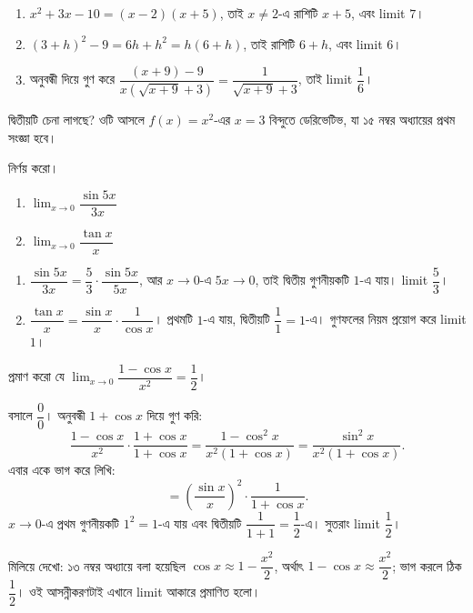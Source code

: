 \documentclass[11pt]{article}
\begin{document}
\begin{sol}
\begin{enumerate}
  \item $x^{2}+3x-10 = (x-2)(x+5)$, তাই $x \neq 2$-এ রাশিটি $x+5$, এবং
        limit $7$।
  \item $(3+h)^{2}-9 = 6h + h^{2} = h(6+h)$, তাই রাশিটি $6+h$, এবং limit $6$।
  \item অনুবন্ধী দিয়ে গুণ করে
        $\dfrac{(x+9)-9}{x\left( \sqrt{x+9}+3 \right)}
        = \dfrac{1}{\sqrt{x+9}+3}$, তাই limit $\dfrac{1}{6}$।
\end{enumerate}
দ্বিতীয়টি চেনা লাগছে? ওটি আসলে $f(x) = x^{2}$-এর $x = 3$ বিন্দুতে ডেরিভেটিভ,
যা ১৫ নম্বর অধ্যায়ের প্রথম সংজ্ঞা হবে।
\end{sol}

 নির্ণয় করো।
\begin{enumerate}
  \item $\lim_{x \to 0} \dfrac{\sin 5x}{3x}$
  \item $\lim_{x \to 0} \dfrac{\tan x}{x}$
\end{enumerate}

\begin{sol}
\begin{enumerate}
  \item $\dfrac{\sin 5x}{3x} = \dfrac{5}{3} \cdot \dfrac{\sin 5x}{5x}$, আর
        $x \to 0$-এ $5x \to 0$, তাই দ্বিতীয় গুণনীয়কটি $1$-এ যায়। limit
        $\dfrac{5}{3}$।
  \item $\dfrac{\tan x}{x} = \dfrac{\sin x}{x} \cdot \dfrac{1}{\cos x}$।
        প্রথমটি $1$-এ যায়, দ্বিতীয়টি $\dfrac{1}{1} = 1$-এ। গুণফলের নিয়ম
        প্রয়োগ করে limit $1$।
\end{enumerate}
\end{sol}

 প্রমাণ করো যে
$\lim_{x \to 0} \dfrac{1-\cos x}{x^{2}} = \dfrac{1}{2}$।

\begin{sol}
বসালে $\dfrac{0}{0}$। অনুবন্ধী $1+\cos x$ দিয়ে গুণ করি:
\[
  \frac{1-\cos x}{x^{2}} \cdot \frac{1+\cos x}{1+\cos x}
  = \frac{1-\cos^{2}x}{x^{2}\left( 1+\cos x \right)}
  = \frac{\sin^{2}x}{x^{2}\left( 1+\cos x \right)} .
\]
এবার একে ভাগ করে লিখি:
\[
  = \left( \frac{\sin x}{x} \right)^{2} \cdot \frac{1}{1+\cos x} .
\]
$x \to 0$-এ প্রথম গুণনীয়কটি $1^{2} = 1$-এ যায় এবং দ্বিতীয়টি
$\dfrac{1}{1+1} = \dfrac{1}{2}$-এ। সুতরাং limit $\dfrac{1}{2}$।

মিলিয়ে দেখো: ১৩ নম্বর অধ্যায়ে বলা হয়েছিল
$\cos x \approx 1 - \dfrac{x^{2}}{2}$, অর্থাৎ
$1 - \cos x \approx \dfrac{x^{2}}{2}$; ভাগ করলে ঠিক $\dfrac{1}{2}$। ওই
আসন্নীকরণটাই এখানে limit আকারে প্রমাণিত হলো।
\end{sol}
\end{document}

